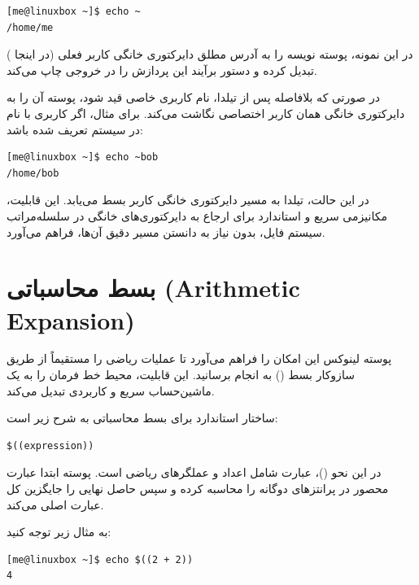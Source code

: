 \begin{latin}
\begin{lstlisting}
[me@linuxbox ~]$ echo ~
/home/me
\end{lstlisting}
\end{latin}

در این نمونه، پوسته نویسه \cmd{\textasciitilde} را به آدرس مطلق دایرکتوری خانگی کاربر فعلی (در اینجا ) تبدیل کرده و دستور  برآیند این پردازش را در خروجی چاپ می‌کند.

در صورتی که بلافاصله پس از تیلدا، نام کاربری خاصی قید شود، پوسته آن را به دایرکتوری خانگی همان کاربر اختصاصی نگاشت می‌کند. برای مثال، اگر کاربری با نام  در سیستم تعریف شده باشد:

\begin{latin}
\begin{lstlisting}
[me@linuxbox ~]$ echo ~bob
/home/bob
\end{lstlisting}
\end{latin}

در این حالت، تیلدا به مسیر دایرکتوری خانگی کاربر  بسط می‌یابد. این قابلیت، مکانیزمی سریع و استاندارد برای ارجاع به دایرکتوری‌های خانگی در سلسله‌مراتب سیستم فایل، بدون نیاز به دانستن مسیر دقیق آن‌ها، فراهم می‌آورد.

\section{بسط محاسباتی (Arithmetic Expansion)}

پوسته لینوکس این امکان را فراهم می‌آورد تا عملیات ریاضی را مستقیماً از طریق سازوکار بسط () به انجام برسانید. این قابلیت، محیط خط فرمان را به یک ماشین‌حساب سریع و کاربردی تبدیل می‌کند.

ساختار استاندارد برای بسط محاسباتی به شرح زیر است:

\begin{latin}
\begin{lstlisting}
$((expression))
\end{lstlisting}
\end{latin}

در این نحو ()، عبارت  شامل اعداد و عملگرهای ریاضی است. پوسته ابتدا عبارت محصور در پرانتزهای دوگانه را محاسبه کرده و سپس حاصل نهایی را جایگزین کل عبارت اصلی می‌کند.

به مثال زیر توجه کنید:

\begin{latin}
\begin{lstlisting}
[me@linuxbox ~]$ echo $((2 + 2))
4
\end{lstlisting}
\end{latin}

